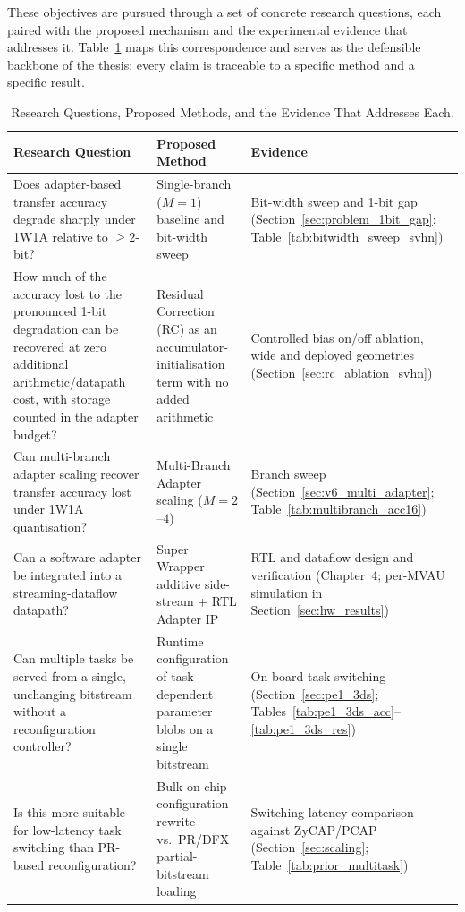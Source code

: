 \documentclass[12pt, a4paper]{report}
\numberwithin{equation}{chapter}
\numberwithin{figure}{chapter}
\numberwithin{table}{chapter}
\numberwithin{algorithm}{chapter}
\begin{document}
These objectives are pursued through a set of concrete research questions, each paired with the proposed mechanism and the experimental evidence that addresses it. Table~\ref{tab:research_questions} maps this correspondence and serves as the defensible backbone of the thesis: every claim is traceable to a specific method and a specific result.

\begin{table}[H]
\centering
\caption{Research Questions, Proposed Methods, and the Evidence That Addresses Each.}
\label{tab:research_questions}
\renewcommand{\arraystretch}{1.4}
\begin{tabular}{|p{5.18cm}|p{4.12cm}|p{4.50cm}|}
\hline
\textbf{Research Question} & \textbf{Proposed Method} & \textbf{Evidence} \\
\hline\hline
Does adapter-based transfer accuracy degrade sharply under 1W1A relative to $\geq 2$-bit? & Single-branch ($M{=}1$) baseline and bit-width sweep & Bit-width sweep and 1-bit gap (Section~\ref{sec:problem_1bit_gap}; Table~\ref{tab:bitwidth_sweep_svhn}) \\
\hline
How much of the accuracy lost to the pronounced 1-bit degradation can be recovered at zero additional arithmetic/datapath cost, with storage counted in the adapter budget? & Residual Correction (RC) as an accumulator-initialisation term with no added arithmetic & Controlled bias on/off ablation, wide and deployed geometries (Section~\ref{sec:rc_ablation_svhn}) \\
\hline
Can multi-branch adapter scaling recover transfer accuracy lost under 1W1A quantisation? & Multi-Branch Adapter scaling ($M{=}2$--$4$) & Branch sweep (Section~\ref{sec:v6_multi_adapter}; Table~\ref{tab:multibranch_acc16}) \\
\hline
Can a software adapter be integrated into a streaming-dataflow datapath? & Super Wrapper additive side-stream + RTL Adapter IP & RTL and dataflow design and verification (Chapter~4; per-MVAU simulation in Section~\ref{sec:hw_results}) \\
\hline
Can multiple tasks be served from a single, unchanging bitstream without a reconfiguration controller? & Runtime configuration of task-dependent parameter blobs on a single bitstream & On-board task switching (Section~\ref{sec:pe1_3ds}; Tables~\ref{tab:pe1_3ds_acc}--\ref{tab:pe1_3ds_res}) \\
\hline
Is this more suitable for low-latency task switching than PR-based reconfiguration? & Bulk on-chip configuration rewrite vs.\ PR/DFX partial-bitstream loading & Switching-latency comparison against ZyCAP/PCAP (Section~\ref{sec:scaling}; Table~\ref{tab:prior_multitask}) \\
\hline
\end{tabular}
\end{table}
\end{document}
